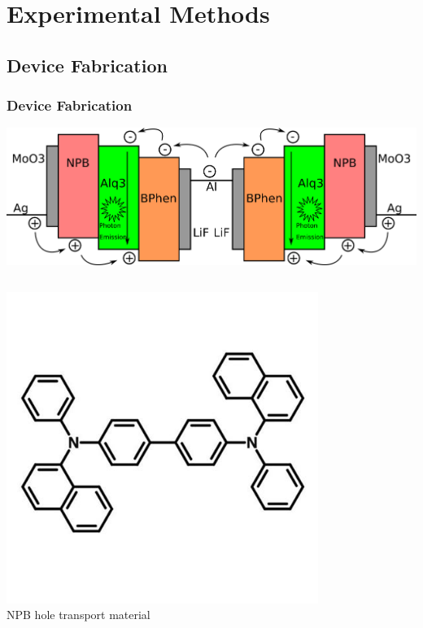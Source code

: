 \documentclass{beamer}
\begin{document}
\section{Experimental Methods}
    \frame{\tableofcontents[currentsection]}
    \subsection{Device Fabrication}
		\begin{frame}
			\frametitle{Device Fabrication}
			\centering
			\includegraphics[width=\textwidth]{images/microcavity_band_diagram.png}
			\vspace{0.5cm}
			\begin{columns}
				\begin{column}{0.3\textwidth}
					\centering
					\includegraphics[width=0.8\textwidth]{images/npb_structure.jpg}\\
					\tiny NPB hole transport material
				\end{column}
				\begin{column}{0.3\textwidth}
					\centering

\end{column}
\end{columns}
\end{frame}
\end{document}
